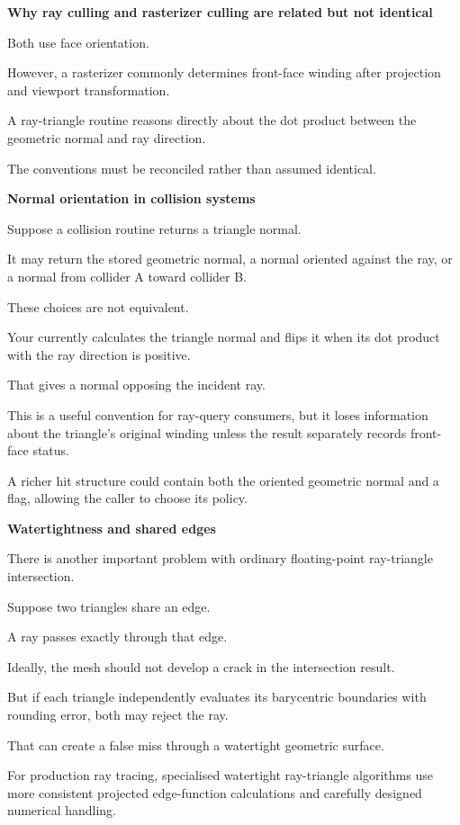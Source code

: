\textbf{Why ray culling and rasterizer culling are related but not identical}

Both use face orientation.

However, a rasterizer commonly determines front-face winding after projection and viewport transformation.

A ray-triangle routine reasons directly about the dot product between the geometric normal and ray direction.

The conventions must be reconciled rather than assumed identical.

\textbf{Normal orientation in collision systems}

Suppose a collision routine returns a triangle normal.

It may return the stored geometric normal, a normal oriented against the ray, or a normal from collider A toward collider B.

These choices are not equivalent.

Your  currently calculates the triangle normal and flips it when its dot product with the ray direction is positive.

That gives a normal opposing the incident ray.

This is a useful convention for ray-query consumers, but it loses information about the triangle's original winding unless the result separately records front-face status.

A richer hit structure could contain both the oriented geometric normal and a  flag, allowing the caller to choose its policy.

\textbf{Watertightness and shared edges}

There is another important problem with ordinary floating-point ray-triangle intersection.

Suppose two triangles share an edge.

A ray passes exactly through that edge.

Ideally, the mesh should not develop a crack in the intersection result.

But if each triangle independently evaluates its barycentric boundaries with rounding error, both may reject the ray.

That can create a false miss through a watertight geometric surface.

For production ray tracing, specialised watertight ray-triangle algorithms use more consistent projected edge-function calculations and carefully designed numerical handling.

